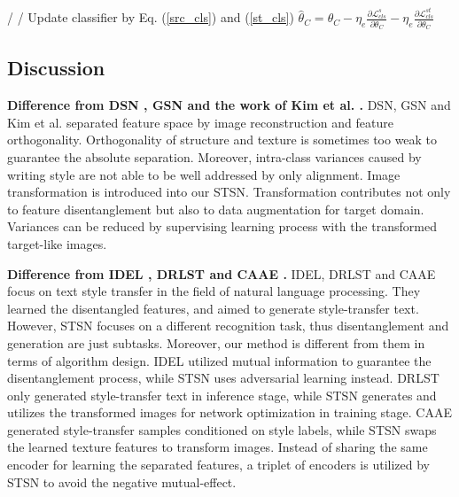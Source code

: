 \documentclass[10pt,journal,compsoc,twocolumn ]{IEEEtran}
\begin{document}
\begin{algorithm}[htb]
\begin{algorithmic}[1]
\STATE / / Update classifier by Eq. (\ref{src_cls}) and (\ref{st_cls})
\STATE $\hat{\theta}_{C}=\theta_{C}-\eta_e \frac{\partial \mathcal{L}_{cls}^{s}}{\partial \theta_{C}}-\eta_e \frac{\partial\mathcal{L}_{cls}^{st}  }{\partial \theta_{C}}$
\end{algorithmic}
\end{algorithm}

\subsection{Discussion}

\textbf{Difference from DSN \cite{bousmalis2016domain}, GSN \cite{shi2018genre} and the work of Kim et al. \cite{kim2017adversarial}.} DSN, GSN and Kim et al. separated feature space by image reconstruction and feature orthogonality.  Orthogonality of structure and texture is sometimes too weak to guarantee the absolute separation. Moreover, intra-class variances caused by writing style are not able to be well addressed by only alignment. Image transformation is introduced into our STSN. Transformation contributes not only to feature disentanglement but also to data augmentation for target domain. %
Variances can be reduced by supervising learning process with the transformed target-like images.

\textbf{Difference from IDEL \cite{cheng2020improving}, DRLST \cite{john2019disentangled} and CAAE \cite{shen2017style}.} IDEL, DRLST and CAAE focus on text style transfer in the field of natural language processing. They learned the disentangled features, and aimed to generate style-transfer text. However, STSN focuses on a different recognition task, thus disentanglement and generation are just subtasks. Moreover, our method is different from them in terms of algorithm design. IDEL utilized mutual information to guarantee the disentanglement process, while STSN uses adversarial learning instead. DRLST only generated style-transfer text in inference stage, while STSN generates and utilizes the transformed images for network optimization in training stage. CAAE generated style-transfer samples conditioned on style labels, while STSN swaps the learned texture features to transform images. Instead of sharing the same encoder for learning the separated features, a triplet of encoders is utilized by STSN to avoid the negative mutual-effect.
\end{document}
